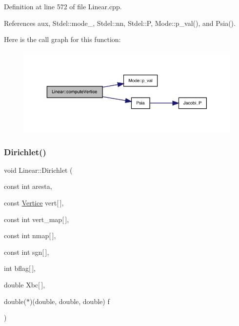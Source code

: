 Definition at line 572 of file Linear.\+cpp.



References aux, Stdel\+::mode\+\_\+, Stdel\+::nn, Stdel\+::P, Mode\+::p\+\_\+val(), and Psia().

Here is the call graph for this function\+:
\nopagebreak
\begin{figure}[H]
\begin{center}
\leavevmode
\includegraphics[width=350pt]{classLinear_a4a1185c65f66ed46704c347af184b922_cgraph}
\end{center}
\end{figure}
\mbox{\label{classLinear_a5c45a2a325998e84e10082a6073f7dfc}} 
\subsubsection{\texorpdfstring{Dirichlet()}{Dirichlet()}}
{\footnotesize\ttfamily void Linear\+::\+Dirichlet (\begin{DoxyParamCaption}\item[{const int}]{aresta,  }\item[{const \hyperlink{structVertice}{Vertice}}]{vert\mbox{[}$\,$\mbox{]},  }\item[{const int}]{vert\+\_\+map\mbox{[}$\,$\mbox{]},  }\item[{const int}]{nmap\mbox{[}$\,$\mbox{]},  }\item[{const int}]{sgn\mbox{[}$\,$\mbox{]},  }\item[{int}]{bflag\mbox{[}$\,$\mbox{]},  }\item[{double}]{Xbc\mbox{[}$\,$\mbox{]},  }\item[{double($\ast$)(double, double, double)}]{f }\end{DoxyParamCaption})\hspace{0.3cm}{\ttfamily [virtual]}}



